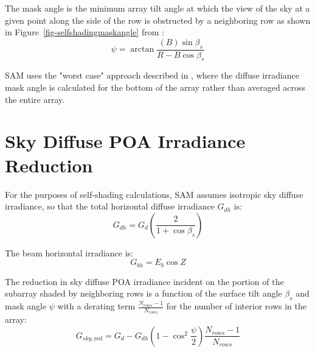 \documentclass[12pt,letterpaper]{article}
\begin{document}
The mask angle is the minimum array tilt angle at which the view of the sky at a given point along the side of the row is obstructed by a neighboring row as shown in Figure~\ref{fig-selfshadingmaskangle} from \citet{passias1984}:
\begin{equation}
\psi = \arctan \frac{ (B)\sin\beta_s } { R - B\cos\beta_s }
\end{equation}

SAM uses the "worst case" approach described in \citep{deline2013b}, where the diffuse irradiance mask angle is calculated for the bottom of the array rather than averaged across the entire array.

\section{Sky Diffuse POA Irradiance Reduction} \label{sec-selfshaddiff}

For the purposes of self-shading calculations, SAM assumes isotropic sky diffuse irradiance, so that the total horizontal diffuse irradiance $G_{dh}$ is:
\begin{equation}\label{eqn-selfshaddiffhor}
G_{dh} = G_d \left(\frac{2}{1+\cos\beta_s}\right)
\end{equation}

The beam horizontal irradiance is:
\begin{equation}
G_{bh} = E_b\cos Z 
\end{equation}



The reduction in sky diffuse POA irradiance incident on the portion of the subarray shaded by neighboring rows is a function of the surface tilt angle $\beta_s$ and mask angle $\psi$ with a derating term $\frac{N_{rows}-1}{N_{rows}}$ for the number of interior rows in the array:
\begin{equation}\label{eqn-selfshad-skydiff2}
G_{sky,\text{red}} = G_d - G_{dh}\left(1 - \cos^2\frac{\psi}{2}\right)\frac{N_{rows} - 1}{N_{rows}}
\end{equation}
\end{document}
